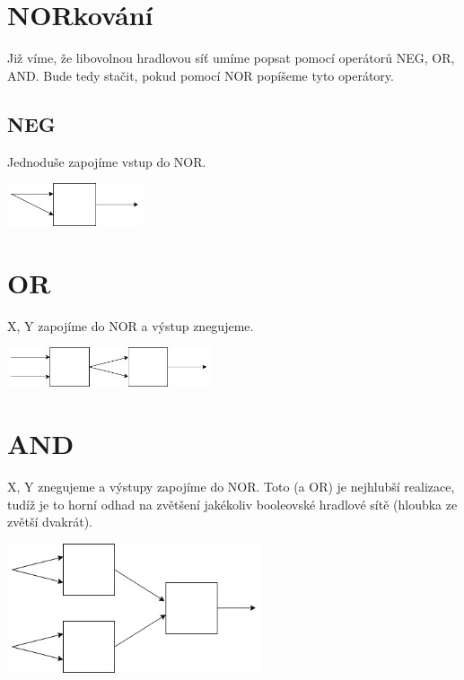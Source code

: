 \documentclass[a4paper]{article}
\begin{document}
\renewcommand{\headrulewidth}{0pt} %
\thispagestyle{fancy} %
{}

\section*{NORkování}
Již víme, že libovolnou hradlovou síť umíme popsat pomocí operátorů NEG, OR, AND. Bude tedy stačit, pokud pomocí NOR popíšeme tyto operátory.

\subsection*{NEG}
Jednoduše zapojíme vstup do NOR.

\begin{center}
\includegraphics[width=4cm]{neg}
\end{center}

\section*{OR}
X, Y zapojíme do NOR a výstup znegujeme.

\begin{center}
\includegraphics[width=6cm]{or}
\end{center}


\section*{AND}
X, Y znegujeme a výstupy zapojíme do NOR. Toto (a OR) je nejhlubší realizace, tudíž je to horní odhad na zvětšení jakékoliv booleovské hradlové sítě (hloubka ze zvětší dvakrát).
\begin{center}
\includegraphics[width=7.5cm]{and}
\end{center}
\end{document}

